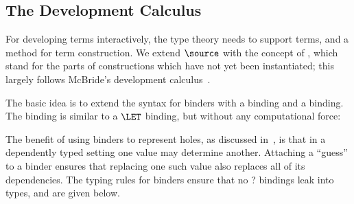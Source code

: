 \subsection{The Development Calculus}

For developing terms interactively, the type theory needs to support
 terms, and a method for term construction. We
extend $\source$ with the concept of , which stand for
the parts of constructions which have not yet been instantiated; this
largely follows McBride's \Oleg{} development
calculus~\cite{mcbride-thesis}.

The basic idea is to extend the syntax for binders with a 
binding and a  binding. The  binding is
similar to a $\LET$ binding, but without any computational force:


The benefit of using binders to represent holes, as discussed
in~\cite{mcbride-thesis}, is that in a dependently typed setting one
value may determine another. Attaching a ``guess'' to a binder 
ensures that replacing one such value also replaces all of its
dependencies. The typing rules for binders ensure that no ? bindings
leak into types, and are given below.





